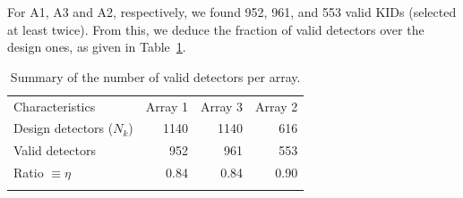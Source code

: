 For A1, A3 and A2, respectively, we found 952, 961, and 553 valid KIDs
 (selected at least twice). From this, we deduce the fraction of
valid detectors over the design ones, as given in Table~\ref{tab:number_of_kids}.



\begin{table}[!htbp]
  \begin{center}
    \caption[Number of detectors]{Summary of the number of valid detectors per array.}
    \label{tab:number_of_kids}  
    \begin{tabular}{lrrr}
      \hline
      \hline
      \noalign{\smallskip}
      Characteristics & Array 1 & Array 3  & Array 2  \\
      \noalign{\smallskip}
      \hline
      \noalign{\smallskip}
      Design detectors ($N_k$)  & 1140  & 1140   & 616  \\
      Valid detectors           & 952   & 961    & 553  \\ 
      Ratio $\equiv \eta$       & 0.84  & 0.84   & 0.90   \\
      \noalign{\smallskip}
      \hline
    \end{tabular}
  \end{center}    
\end{table}


